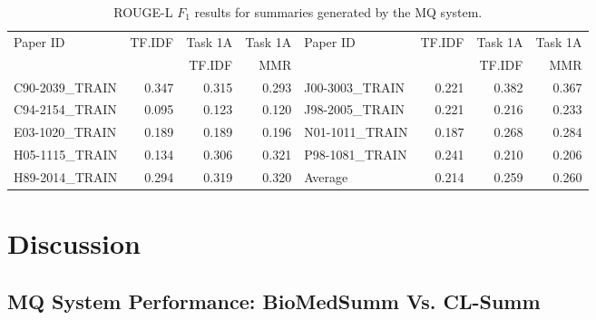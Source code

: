 \documentclass[11pt]{article}
\begin{document}
\begin{table*}
  \centering
  \begin{tabular}{|l|r|r|r||l|r|r|r|}
  \hline
	Paper ID & TF.IDF & Task 1A  & Task 1A & 	Paper ID & TF.IDF & Task 1A  & Task 1A  \\
			&	& TF.IDF & MMR & 	&	& TF.IDF & MMR \\
	\hline
	C90-2039\_TRAIN & 0.347 & 0.315 & 0.293 &	J00-3003\_TRAIN & 0.221 & 0.382 & 0.367\\
	C94-2154\_TRAIN & 0.095 & 0.123 & 0.120 & 	J98-2005\_TRAIN & 0.221 & 0.216 & 0.233\\
	E03-1020\_TRAIN & 0.189 & 0.189 & 0.196 &	N01-1011\_TRAIN & 0.187 & 0.268 & 0.284\\
	H05-1115\_TRAIN & 0.134 & 0.306 & 0.321 & 	P98-1081\_TRAIN & 0.241 & 0.210 & 0.206\\
\cline{5-8}
	H89-2014\_TRAIN & 0.294 & 0.319 & 0.320 &	Average & 0.214 & 0.259 & 0.260 \\
	\hline
  \end{tabular}
  \caption{ROUGE-L $F_1$ results for summaries generated by the MQ system.}
  \label{tab:task2v2}
\end{table*}

%



\section{Discussion}
\vspace{-.3cm}
\subsection{MQ System Performance: BioMedSumm Vs. CL-Summ}
\end{document}
